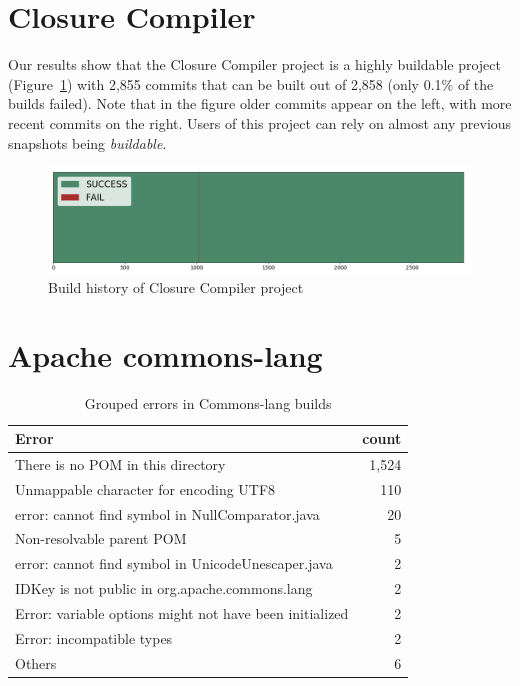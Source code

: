 \section{Closure Compiler}

Our results show that the Closure Compiler project is a highly buildable project (Figure~\ref{fig:closureHist}) with 2,855 commits that can be built out of 2,858 (only 0.1\% of the builds failed).
Note that in the figure older commits appear on the left, with more recent commits on the right.
Users of this project can rely on almost any previous snapshots being \emph{buildable}.

\begin{figure}[h]
	\begin{center}
		\includegraphics[width=\linewidth]{charts/ClosureHist}
		\caption{Build history of Closure Compiler project}
		\label{fig:closureHist}
	\end{center}
\end{figure}

\section{Apache commons-lang}

\begin{table}[h]
	\caption{Grouped errors in Commons-lang builds}
	\label{table:langErrors}
	\begin{center}
	\begin{tabular}{lr}
		\toprule
		\bf{Error} & \bf{count} \\ 
		\midrule
		There is no POM in this directory & 1,524 \\
		Unmappable character for encoding UTF8	& 110 \\
		error: cannot find symbol in NullComparator.java & 20 \\
		Non-resolvable parent POM & 5 \\
		error: cannot find symbol in UnicodeUnescaper.java & 2 \\
		IDKey is not public in org.apache.commons.lang & 2 \\
		Error: variable options might not have been initialized & 2 \\
		Error: incompatible types & 2 \\
		Others & 6 \\
		\bottomrule
	\end{tabular}
	\end{center}
\end{table}

